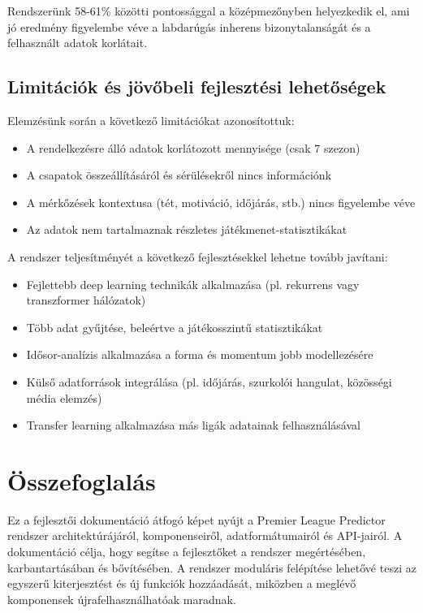 Rendszerünk 58-61\% közötti pontossággal a középmezőnyben helyezkedik el, ami jó eredmény figyelembe véve a labdarúgás inherens bizonytalanságát és a felhasznált adatok korlátait.

\subsection{Limitációk és jövőbeli fejlesztési lehetőségek}

Elemzésünk során a következő limitációkat azonosítottuk:

\begin{itemize}
    \item A rendelkezésre álló adatok korlátozott mennyisége (csak 7 szezon)
    \item A csapatok összeállításáról és sérülésekről nincs információnk
    \item A mérkőzések kontextusa (tét, motiváció, időjárás, stb.) nincs figyelembe véve
    \item Az adatok nem tartalmaznak részletes játékmenet-statisztikákat
\end{itemize}

A rendszer teljesítményét a következő fejlesztésekkel lehetne tovább javítani:

\begin{itemize}
    \item Fejlettebb deep learning technikák alkalmazása (pl. rekurrens vagy transzformer hálózatok)
    \item Több adat gyűjtése, beleértve a játékosszintű statisztikákat
    \item Idősor-analízis alkalmazása a forma és momentum jobb modellezésére
    \item Külső adatforrások integrálása (pl. időjárás, szurkolói hangulat, közösségi média elemzés)
    \item Transfer learning alkalmazása más ligák adatainak felhasználásával
\end{itemize}

\section{Összefoglalás}

Ez a fejlesztői dokumentáció átfogó képet nyújt a Premier League Predictor rendszer architektúrájáról, komponenseiről, adatformátumairól és API-jairól. A dokumentáció célja, hogy segítse a fejlesztőket a rendszer megértésében, karbantartásában és bővítésében. A rendszer moduláris felépítése lehetővé teszi az egyszerű kiterjesztést és új funkciók hozzáadását, miközben a meglévő komponensek újrafelhasználhatóak maradnak. 